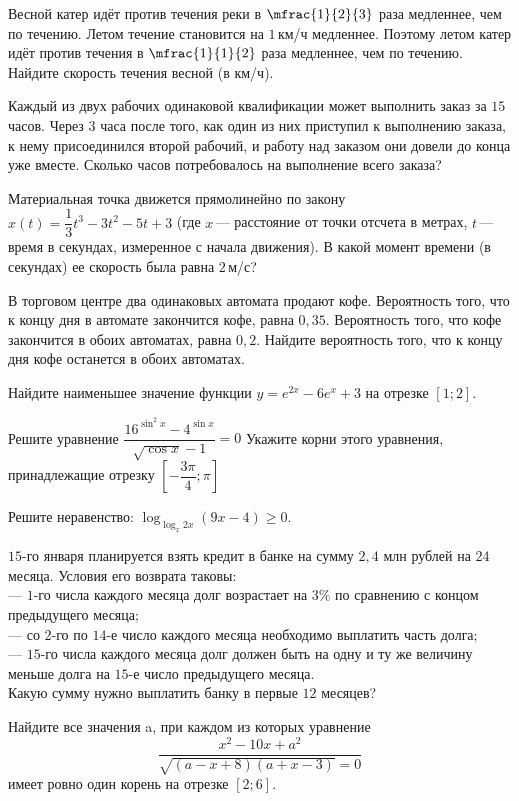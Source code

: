 \begin{class}[number=4]
	\begin{listofex}
		\item Весной катер идёт против течения реки в \(\mfrac{1 }{2 }{ 3}\) раза медленнее, чем по течению. Летом течение становится на \(1\) км/ч медленнее. Поэтому летом катер идёт против течения в \(\mfrac{1 }{1 }{2 }\) раза медленнее, чем по течению. Найдите скорость течения весной (в км/ч).
		\item Каждый из двух рабочих одинаковой квалификации может выполнить заказ за \(15\) часов. Через \(3\) часа после того, как один из них приступил к выполнению заказа, к нему присоединился второй рабочий, и работу над заказом они довели до конца уже вместе. Сколько часов потребовалось на выполнение всего заказа?
		\item Материальная точка движется прямолинейно по закону \(x(t)=\dfrac{ 1 }{ 3 }t^3-3t^2-5t+3\) (где \(x\) --- расстояние от точки отсчета в метрах, \(t\) --- время в секундах, измеренное с начала движения). В какой момент времени (в секундах) ее скорость была равна \(2\) м/с?
		\item В торговом центре два одинаковых автомата продают кофе. Вероятность того, что к концу дня в автомате закончится кофе, равна \(0,35\). Вероятность того, что кофе закончится в обоих автоматах, равна \(0,2\). Найдите вероятность того, что к концу дня кофе останется в обоих автоматах.
		\item Найдите наименьшее значение функции \(y=e^{2x}-6e^x+3\) на отрезке \([1;2]\).
		\item 
		\begin{tasks}
			\task Решите уравнение \( \dfrac{ 16^{\sin^2x}-4^{\sin x} }{ \sqrt{\cos x}-1 }=0 \)
			\task Укажите корни этого уравнения, принадлежащие отрезку \(\left[ -\dfrac{ 3\pi }{ 4 }; \pi \right] \)
		\end{tasks}
		\item Решите неравенство: \(\log_{\log_x 2x}(9x-4) \ge 0 \).
		\item \(15\)-го января планируется взять кредит в банке на сумму \(2,4\) млн рублей на \(24\) месяца. Условия его возврата таковы: \\
		--- \(1\)-го числа каждого месяца долг возрастает на \(3\%\) по сравнению с концом предыдущего месяца; \\
		--- со \(2\)-го по \(14\)-е число каждого месяца необходимо выплатить часть долга; \\
		--- \(15\)-го числа каждого месяца долг должен быть на одну и ту же величину меньше долга на \(15\)-е число предыдущего месяца. \\
		Какую сумму нужно выплатить банку в первые \(12\) месяцев?
		
		\item Найдите все значения a, при каждом из которых уравнение
		\[\dfrac{ x^2-10x+a^2 }{ \sqrt{(a-x+8)(a+x-3)}=0 }\]
		имеет ровно один корень на отрезке \([2; 6]\).
	\end{listofex}
\end{class}

